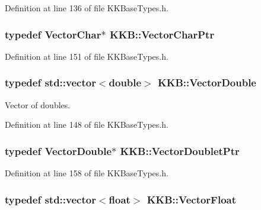 Definition at line 136 of file K\+K\+Base\+Types.\+h.

\subsubsection[{\texorpdfstring{Vector\+Char\+Ptr}{VectorCharPtr}}]{\setlength{\rightskip}{0pt plus 5cm}typedef {\bf Vector\+Char}$\ast$ {\bf K\+K\+B\+::\+Vector\+Char\+Ptr}}\hypertarget{namespace_k_k_b_acdcd703f4c3f54b8a4aa38cdc95af701}{}\label{namespace_k_k_b_acdcd703f4c3f54b8a4aa38cdc95af701}


Definition at line 151 of file K\+K\+Base\+Types.\+h.

\subsubsection[{\texorpdfstring{Vector\+Double}{VectorDouble}}]{\setlength{\rightskip}{0pt plus 5cm}typedef std\+::vector$<$double$>$ {\bf K\+K\+B\+::\+Vector\+Double}}\hypertarget{namespace_k_k_b_a5906c207479607e5f450434095914a41}{}\label{namespace_k_k_b_a5906c207479607e5f450434095914a41}


Vector of doubles. 



Definition at line 148 of file K\+K\+Base\+Types.\+h.

\subsubsection[{\texorpdfstring{Vector\+Doublet\+Ptr}{VectorDoubletPtr}}]{\setlength{\rightskip}{0pt plus 5cm}typedef {\bf Vector\+Double}$\ast$ {\bf K\+K\+B\+::\+Vector\+Doublet\+Ptr}}\hypertarget{namespace_k_k_b_a035c6931de674cc639eaebeca6419ad8}{}\label{namespace_k_k_b_a035c6931de674cc639eaebeca6419ad8}


Definition at line 158 of file K\+K\+Base\+Types.\+h.

\subsubsection[{\texorpdfstring{Vector\+Float}{VectorFloat}}]{\setlength{\rightskip}{0pt plus 5cm}typedef std\+::vector$<$float$>$ {\bf K\+K\+B\+::\+Vector\+Float}}\hypertarget{namespace_k_k_b_a4820c3670ee1fe74f0c4de981c600faf}{}\label{namespace_k_k_b_a4820c3670ee1fe74f0c4de981c600faf}


